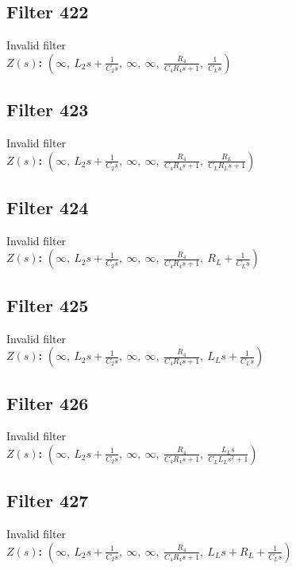 \documentclass{article}
\begin{document}
\subsection*{Filter 422}
Invalid filter \\ 
\textbf{$Z(s)$:} $\left( \infty, \  L_{2} s + \frac{1}{C_{2} s}, \  \infty, \  \infty, \  \frac{R_{4}}{C_{4} R_{4} s + 1}, \  \frac{1}{C_{L} s}\right)$ \\ 
\subsection*{Filter 423}
Invalid filter \\ 
\textbf{$Z(s)$:} $\left( \infty, \  L_{2} s + \frac{1}{C_{2} s}, \  \infty, \  \infty, \  \frac{R_{4}}{C_{4} R_{4} s + 1}, \  \frac{R_{L}}{C_{L} R_{L} s + 1}\right)$ \\ 
\subsection*{Filter 424}
Invalid filter \\ 
\textbf{$Z(s)$:} $\left( \infty, \  L_{2} s + \frac{1}{C_{2} s}, \  \infty, \  \infty, \  \frac{R_{4}}{C_{4} R_{4} s + 1}, \  R_{L} + \frac{1}{C_{L} s}\right)$ \\ 
\subsection*{Filter 425}
Invalid filter \\ 
\textbf{$Z(s)$:} $\left( \infty, \  L_{2} s + \frac{1}{C_{2} s}, \  \infty, \  \infty, \  \frac{R_{4}}{C_{4} R_{4} s + 1}, \  L_{L} s + \frac{1}{C_{L} s}\right)$ \\ 
\subsection*{Filter 426}
Invalid filter \\ 
\textbf{$Z(s)$:} $\left( \infty, \  L_{2} s + \frac{1}{C_{2} s}, \  \infty, \  \infty, \  \frac{R_{4}}{C_{4} R_{4} s + 1}, \  \frac{L_{L} s}{C_{L} L_{L} s^{2} + 1}\right)$ \\ 
\subsection*{Filter 427}
Invalid filter \\ 
\textbf{$Z(s)$:} $\left( \infty, \  L_{2} s + \frac{1}{C_{2} s}, \  \infty, \  \infty, \  \frac{R_{4}}{C_{4} R_{4} s + 1}, \  L_{L} s + R_{L} + \frac{1}{C_{L} s}\right)$ \\ 
\end{document}
